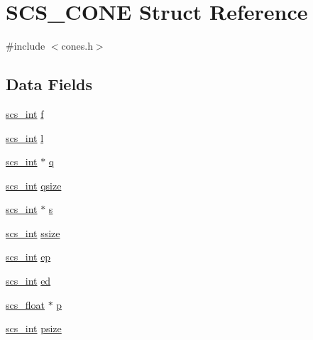 \hypertarget{struct_s_c_s___c_o_n_e}{\section{S\-C\-S\-\_\-\-C\-O\-N\-E Struct Reference}
\label{struct_s_c_s___c_o_n_e}
}


{\ttfamily \#include $<$cones.\-h$>$}

\subsection*{Data Fields}
\begin{DoxyCompactItemize}
\item 
\hyperlink{glbopts_8h_a23c48a83ce0c58783595ad45ffcaf76b}{scs\-\_\-int} \hyperlink{struct_s_c_s___c_o_n_e_a06b3c39d2e6d717eb7c11df5743f40e1}{f}
\item 
\hyperlink{glbopts_8h_a23c48a83ce0c58783595ad45ffcaf76b}{scs\-\_\-int} \hyperlink{struct_s_c_s___c_o_n_e_a99ffd0fa79fbc69a680913619ed65d14}{l}
\item 
\hyperlink{glbopts_8h_a23c48a83ce0c58783595ad45ffcaf76b}{scs\-\_\-int} $\ast$ \hyperlink{struct_s_c_s___c_o_n_e_af056b31b1537a71fe87f2a32f7fa4177}{q}
\item 
\hyperlink{glbopts_8h_a23c48a83ce0c58783595ad45ffcaf76b}{scs\-\_\-int} \hyperlink{struct_s_c_s___c_o_n_e_a8d86840460aaed0210c107627914453b}{qsize}
\item 
\hyperlink{glbopts_8h_a23c48a83ce0c58783595ad45ffcaf76b}{scs\-\_\-int} $\ast$ \hyperlink{struct_s_c_s___c_o_n_e_a8400cfd0fc6f3ccdb89b6ddcc74d2732}{s}
\item 
\hyperlink{glbopts_8h_a23c48a83ce0c58783595ad45ffcaf76b}{scs\-\_\-int} \hyperlink{struct_s_c_s___c_o_n_e_a743ed457f561a65bc02af67d3fe1d29f}{ssize}
\item 
\hyperlink{glbopts_8h_a23c48a83ce0c58783595ad45ffcaf76b}{scs\-\_\-int} \hyperlink{struct_s_c_s___c_o_n_e_aa0a9b14042fc23dd86a5efa2184f0e9a}{ep}
\item 
\hyperlink{glbopts_8h_a23c48a83ce0c58783595ad45ffcaf76b}{scs\-\_\-int} \hyperlink{struct_s_c_s___c_o_n_e_a5203baab9fb9cb5bf2bbbc7e8bb00d90}{ed}
\item 
\hyperlink{glbopts_8h_ad37836e6404bb2c3ae8adcc6290699b9}{scs\-\_\-float} $\ast$ \hyperlink{struct_s_c_s___c_o_n_e_ae1c69e9c2ac36186c7418c957d3017e8}{p}
\item 
\hyperlink{glbopts_8h_a23c48a83ce0c58783595ad45ffcaf76b}{scs\-\_\-int} \hyperlink{struct_s_c_s___c_o_n_e_a9e0fef883941e507c80f04ccae4c822a}{psize}
\end{DoxyCompactItemize}


